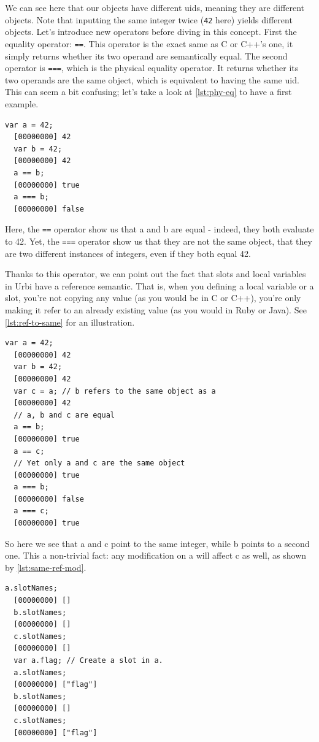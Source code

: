 \documentclass[openright,twoside,12pt]{report}
\newcommand{\C}{C\xspace}
\newcommand{\Cxx}{C++\xspace}
\newcommand{\java}{Java\xspace}
\newcommand{\ruby}{Ruby\xspace}
\newcommand{\urbi}{Urbi\xspace}
\newcommand{\lst}[1]{\autoref{lst:#1}}
\begin{document}
We can see here that our objects have different uids, meaning they are
different objects. Note that inputting the same integer twice
(\texttt{42} here) yields different objects. Let's introduce new
operators before diving in this concept. First the equality operator:
\texttt{==}. This operator is the exact same as \C or \Cxx's one, it
simply returns whether its two operand are semantically equal. The
second operator is \texttt{===}, which is the physical equality
operator. It returns whether its two operands are the same object,
which is equivalent to having the same uid. This can seem a bit
confusing; let's take a look at \lst{phy-eq} to have a first example.

\begin{lstlisting}[caption=Physical equality operator,
  label=lst:phy-eq]
  var a = 42;
  [00000000] 42
  var b = 42;
  [00000000] 42
  a == b;
  [00000000] true
  a === b;
  [00000000] false
\end{lstlisting}

Here, the \texttt{==} operator show us that a and b are equal -
indeed, they both evaluate to 42. Yet, the \texttt{===} operator show
us that they are not the same object, that they are two different
instances of integers, even if they both equal 42.

Thanks to this operator, we can point out the fact that slots and
local variables in \urbi have a reference semantic. That is, when you
defining a local variable or a slot, you're not copying any value (as
you would be in \C or \Cxx), you're only making it refer to an already
existing value (as you would in \ruby or \java). See \lst{ref-to-same}
for an illustration.

\begin{lstlisting}[caption=Two references to the same object,
  label=lst:ref-to-same]
  var a = 42;
  [00000000] 42
  var b = 42;
  [00000000] 42
  var c = a; // b refers to the same object as a
  [00000000] 42
  // a, b and c are equal
  a == b;
  [00000000] true
  a == c;
  // Yet only a and c are the same object
  [00000000] true
  a === b;
  [00000000] false
  a === c;
  [00000000] true
\end{lstlisting}

So here we see that a and c point to the same integer, while b points
to a second one. This a non-trivial fact: any modification on a will
affect c as well, as shown by \lst{same-ref-mod}.

\begin{lstlisting}[caption=Shared modification,
  label=lst:same-ref-mod]
  a.slotNames;
  [00000000] []
  b.slotNames;
  [00000000] []
  c.slotNames;
  [00000000] []
  var a.flag; // Create a slot in a.
  a.slotNames;
  [00000000] ["flag"]
  b.slotNames;
  [00000000] []
  c.slotNames;
  [00000000] ["flag"]
\end{lstlisting}
\end{document}
